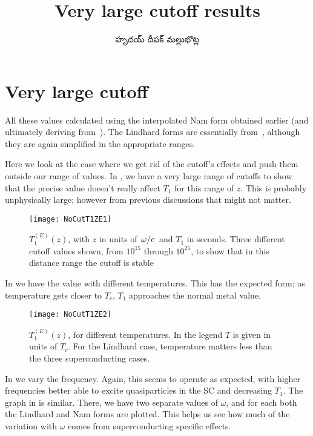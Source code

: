 \documentclass[../main.tex]{subfiles}
\title{Very large cutoff results}
\author{\begin{telugu}హృదయ్ దీపక్ మల్లుభొట్ల\end{telugu}}
\date{}
\begin{document}
	\onlyinsubfile{\maketitle}

	\section{Very large cutoff} \label{sec:nocut:intro}

	All these values calculated using the interpolated Nam form obtained earlier (and ultimately deriving from~\cite{Nam1967}).
	The Lindhard forms are essentially from~\cite{SolyomV3}, although they are again simplified in the appropriate ranges.

	Here we look at the case where we get rid of the cutoff's effects and push them outside our range of values.
	In , we have a very large range of cutoffs to show that the precise value doesn't really affect $T_1$ for this range of $z$.
	This is probably unphysically large;
	however from previous discussions that might not matter.

	\begin{figure}[htp]
		\centering
		\texttt{[image: NoCutT1ZE1]}
		\caption{$T_{1}^{(E)}(z)$, with $z$ in units of $\flatfrac{\omega}{c}$ and $T_1$ in seconds.
		Three different cutoff values shown, from $10^{15}$ through $10^{25}$, to show that in this distance range the cutoff is stable}\label{fig:t1ez}
	\end{figure}

	In  we have the value with different temperatures.
	This has the expected form;
	as temperature gets closer to $T_c$, $T_1$ approaches the normal metal value.

	\begin{figure}[htp]
		\centering
		\texttt{[image: NoCutT1ZE2]}
		\caption{$T_{1}^{(E)}(z)$, for different temperatures.
			In the legend $T$ is given in units of $T_c$.
			For the Lindhard case, temperature matters less than the three superconducting cases.
		} \label{fig:t2ez}
	\end{figure}

	In  we vary the frequency.
	Again, this seems to operate as expected, with higher frequencies better able to excite quasiparticles in the SC and decreasing $T_1$.
	The graph in  is similar.
	There, we have two separate values of $\omega$, and for each both the Lindhard and Nam forms are plotted.
	This helps us see how much of the variation with $\omega$ comes from superconducting specific effects.
\end{document}
